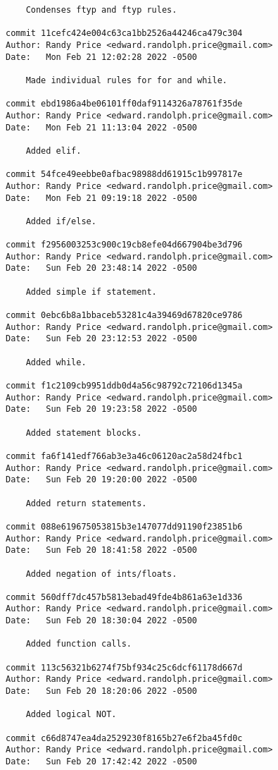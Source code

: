 {\begin{verbatim}
    Condenses ftyp and ftyp rules.

commit 11cefc424e004c63ca1bb2526a44246ca479c304
Author: Randy Price <edward.randolph.price@gmail.com>
Date:   Mon Feb 21 12:02:28 2022 -0500

    Made individual rules for for and while.

commit ebd1986a4be06101ff0daf9114326a78761f35de
Author: Randy Price <edward.randolph.price@gmail.com>
Date:   Mon Feb 21 11:13:04 2022 -0500

    Added elif.

commit 54fce49eebbe0afbac98988dd61915c1b997817e
Author: Randy Price <edward.randolph.price@gmail.com>
Date:   Mon Feb 21 09:19:18 2022 -0500

    Added if/else.

commit f2956003253c900c19cb8efe04d667904be3d796
Author: Randy Price <edward.randolph.price@gmail.com>
Date:   Sun Feb 20 23:48:14 2022 -0500

    Added simple if statement.

commit 0ebc6b8a1bbaceb53281c4a39469d67820ce9786
Author: Randy Price <edward.randolph.price@gmail.com>
Date:   Sun Feb 20 23:12:53 2022 -0500

    Added while.

commit f1c2109cb9951ddb0d4a56c98792c72106d1345a
Author: Randy Price <edward.randolph.price@gmail.com>
Date:   Sun Feb 20 19:23:58 2022 -0500

    Added statement blocks.

commit fa6f141edf766ab3e3a46c06120ac2a58d24fbc1
Author: Randy Price <edward.randolph.price@gmail.com>
Date:   Sun Feb 20 19:20:00 2022 -0500

    Added return statements.

commit 088e619675053815b3e147077dd91190f23851b6
Author: Randy Price <edward.randolph.price@gmail.com>
Date:   Sun Feb 20 18:41:58 2022 -0500

    Added negation of ints/floats.

commit 560dff7dc457b5813ebad49fde4b861a63e1d336
Author: Randy Price <edward.randolph.price@gmail.com>
Date:   Sun Feb 20 18:30:04 2022 -0500

    Added function calls.

commit 113c56321b6274f75bf934c25c6dcf61178d667d
Author: Randy Price <edward.randolph.price@gmail.com>
Date:   Sun Feb 20 18:20:06 2022 -0500

    Added logical NOT.

commit c66d8747ea4da2529230f8165b27e6f2ba45fd0c
Author: Randy Price <edward.randolph.price@gmail.com>
Date:   Sun Feb 20 17:42:42 2022 -0500


\end{verbatim}}
